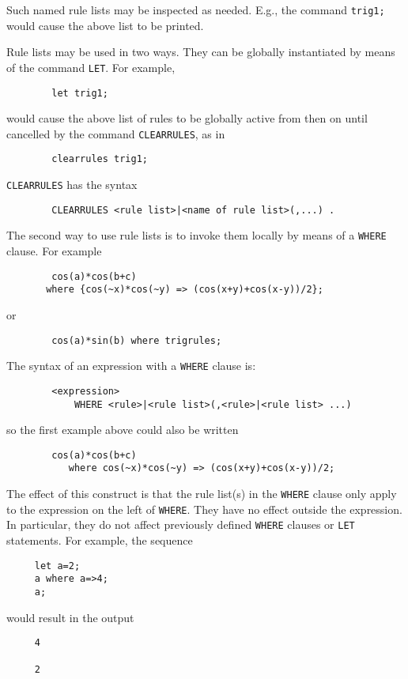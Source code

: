 Such named rule lists may be inspected as needed. E.g., the command
{\tt trig1;} would cause the above list to be printed.

Rule lists may be used in two ways.  They can be globally instantiated by
means of the command {\tt LET}. For example,
\begin{verbatim}
        let trig1;
\end{verbatim}
would cause the above list of rules to be globally active from then on until
cancelled by the command {\tt CLEARRULES}, as in
\begin{verbatim}
        clearrules trig1;
\end{verbatim}
{\tt CLEARRULES} has the syntax
\begin{verbatim}
        CLEARRULES <rule list>|<name of rule list>(,...) .
\end{verbatim}

The second way to use rule lists is to invoke them locally by means of a
{\tt WHERE} clause.  For example
\begin{verbatim}
        cos(a)*cos(b+c)
	   where {cos(~x)*cos(~y) => (cos(x+y)+cos(x-y))/2};
\end{verbatim}
or
\begin{verbatim}
        cos(a)*sin(b) where trigrules;
\end{verbatim}

The syntax of an expression with a {\tt WHERE} clause is:
\begin{verbatim}
        <expression>
            WHERE <rule>|<rule list>(,<rule>|<rule list> ...)
\end{verbatim}
so the first example above could also be written
\begin{verbatim}
        cos(a)*cos(b+c)
           where cos(~x)*cos(~y) => (cos(x+y)+cos(x-y))/2;
\end{verbatim}

The effect of this construct is that the rule list(s) in the {\tt WHERE}
clause only apply to the expression on the left of {\tt WHERE}.  They have
no effect outside the expression.  In particular, they do not affect
previously defined {\tt WHERE} clauses or {\tt LET} statements.  For
example, the sequence
\begin{verbatim}
     let a=2;
     a where a=>4;
     a;
\end{verbatim}
would result in the output
\begin{verbatim}
     4

     2
\end{verbatim}

